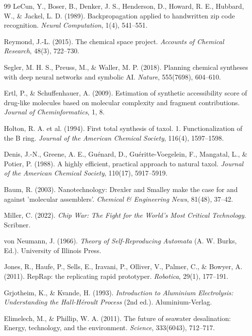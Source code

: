 \documentclass[11pt]{book}
\begin{document}
\begin{thebibliography}{99}
LeCun, Y., Boser, B., Denker, J. S., Henderson, D., Howard, R. E., Hubbard, W., \& Jackel, L. D. (1989). Backpropagation applied to handwritten zip code recognition. \textit{Neural Computation}, 1(4), 541--551.

Reymond, J.-L. (2015). The chemical space project. \textit{Accounts of Chemical Research}, 48(3), 722--730.

Segler, M. H. S., Preuss, M., \& Waller, M. P. (2018). Planning chemical syntheses with deep neural networks and symbolic AI. \textit{Nature}, 555(7698), 604--610.

Ertl, P., \& Schuffenhauer, A. (2009). Estimation of synthetic accessibility score of drug-like molecules based on molecular complexity and fragment contributions. \textit{Journal of Cheminformatics}, 1, 8.

Holton, R. A. et al. (1994). First total synthesis of taxol. 1. Functionalization of the B ring. \textit{Journal of the American Chemical Society}, 116(4), 1597--1598.

Denis, J.-N., Greene, A. E., Guénard, D., Guéritte-Voegelein, F., Mangatal, L., \& Potier, P. (1988). A highly efficient, practical approach to natural taxol. \textit{Journal of the American Chemical Society}, 110(17), 5917--5919.

Baum, R. (2003). Nanotechnology: Drexler and Smalley make the case for and against 'molecular assemblers'. \textit{Chemical \& Engineering News}, 81(48), 37--42.

Miller, C. (2022). \textit{Chip War: The Fight for the World's Most Critical Technology}. Scribner.

von Neumann, J. (1966). \textit{Theory of Self-Reproducing Automata} (A. W. Burks, Ed.). University of Illinois Press.

Jones, R., Haufe, P., Sells, E., Iravani, P., Olliver, V., Palmer, C., \& Bowyer, A. (2011). RepRap: the replicating rapid prototyper. \textit{Robotica}, 29(1), 177--191.

Grjotheim, K., \& Kvande, H. (1993). \textit{Introduction to Aluminium Electrolysis: Understanding the Hall-Héroult Process} (2nd ed.). Aluminium-Verlag.

Elimelech, M., \& Phillip, W. A. (2011). The future of seawater desalination: Energy, technology, and the environment. \textit{Science}, 333(6043), 712--717.


\end{thebibliography}
\end{document}
